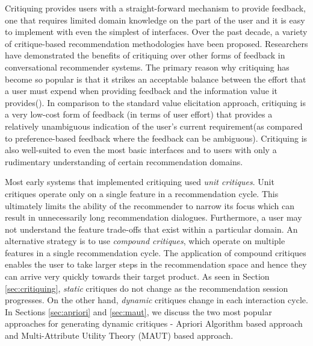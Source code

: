 Critiquing  provides users with a straight-forward mechanism to provide feedback, one that requires limited domain knowledge on the part of the user and it is easy to implement with even the simplest of interfaces.
Over the past decade, a variety of critique-based recommendation methodologies have been proposed.
Researchers have demonstrated the benefits of critiquing over other forms of feedback in conversational recommender systems.
The primary reason why critiquing has become so popular is that it strikes an acceptable balance between the effort that a user must expend when providing feedback and the information value it provides(\cite{mcginty11}).
In comparison to the standard value elicitation approach, critiquing is a very low-cost form of feedback (in terms of user effort) that provides a relatively unambiguous indication of the user's current requirement(as compared to preference-based feedback where the feedback can be ambiguous).
 Critiquing is also well-suited to even the most basic interfaces and to users with only a rudimentary understanding of certain recommendation domains.



Most early systems that implemented critiquing used \textit{unit critiques}.
Unit critiques operate only on a single feature in a recommendation cycle. 
This ultimately limits the ability of the recommender to narrow its focus which can result in unnecessarily long recommendation dialogues.
Furthermore, a user may not understand the feature trade-offs that exist within a particular domain.
An alternative strategy is to use \textit{compound critiques}, which operate on multiple features in a single recommendation cycle.
The application of compound critiques enables the user to take larger steps in the recommendation space and hence they can arrive very quickly towards their target product.
As seen in Section \ref{sec:critiquing}, \textit{static} critiques do not change as the recommendation session progresses. 
On the other hand, \textit{dynamic} critiques change in each interaction cycle.
In Sections \ref{sec:apriori} and \ref{sec:maut}, we discuss the two most popular approaches for generating dynamic critiques - Apriori Algorithm based approach  and Multi-Attribute Utility Theory (MAUT) based approach.




